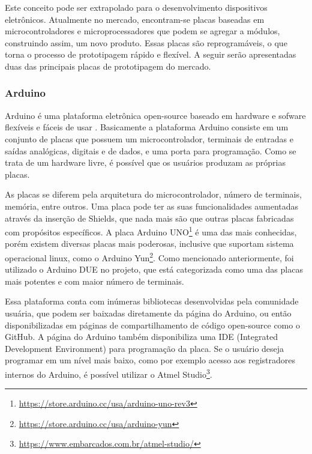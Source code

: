 		Este conceito pode ser extrapolado para o desenvolvimento dispositivos eletrônicos. Atualmente no mercado, encontram-se placas baseadas em microcontroladores e microprocessadores que podem se agregar a módulos, construindo assim, um novo produto. Essas placas são reprogramáveis, o que torna o processo de prototipagem rápido e flexível. A seguir serão apresentadas duas das principais placas de prototipagem do mercado.
		
	\subsubsection{Arduino}
		Arduino é uma plataforma eletrônica 	open-source baseado em hardware e sofware flexíveis e fáceis de usar \cite{arduino}. Basicamente a plataforma Arduino consiste em um conjunto de placas
		que possuem um microcontrolador, terminais de entradas e saídas analógicas, digitais e de dados, e uma porta para programação. Como se trata de um hardware livre, é possível que os usuários produzam as próprias placas.
		
		As placas se diferem pela arquitetura do microcontrolador, número de terminais, memória, entre outros. Uma placa pode ter as suas funcionalidades aumentadas através da inserção de Shields, que nada mais são que outras placas fabricadas com propósitos específicos. A placa Arduino UNO\footnote{\url{https://store.arduino.cc/usa/arduino-uno-rev3}} é uma das mais conhecidas, porém existem diversas placas mais poderosas, inclusive que suportam sistema operacional linux, como o Arduino Yun\footnote{\url{https://store.arduino.cc/usa/arduino-yun}}. Como mencionado anteriormente, foi utilizado o Arduino DUE no projeto, que está categorizada como uma das placas mais potentes e com maior número de terminais.
		
		Essa plataforma conta com inúmeras bibliotecas desenvolvidas pela comunidade usuária, que podem ser baixadas diretamente da página do Arduino, ou então disponibilizadas em páginas de compartilhamento de código open-source como o GitHub. A página do Arduino também disponibiliza uma IDE (Integrated Development Environment) para programação da placa. Se o usuário deseja programar em um nível mais baixo, como por exemplo acesso aos registradores internos do Arduino, é possível utilizar o Atmel Studio\footnote{\url{https://www.embarcados.com.br/atmel-studio/}}.
	
